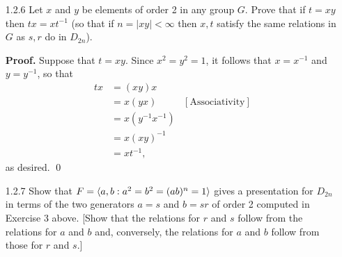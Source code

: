 \begin{enumerate}
      \textbf{Proof.} Let $n$ be an odd integer such that $n \ge 3$. Suppose to
      the contrary that there exists a nonidentity $y \in D_{2n}$ that commutes
      with every other element of $D_{2n}$.
      
      \textbf{Case 1:} \textit{$y = r^i$, with $1 \le i < n$.} By Case 1 in
      Exercise 1.2.4, it follows that $i = k$, and this contradicts
      Exercise 1.1.33(a).
      
      
      \textbf{Case 2:} \textit{$y = sr^i$, with $0 \le i < n$.} By Case 2 in
      Exercise 1.24, we will arrive at a contradiction.

      We can now conclude that the identity is the only element of $D_{2n}$ 
      which commutes with all elements of $D_{2n}$. \qed

   \item[1.2.6]   Let $x$ and $y$ be elements of order 2 in any group $G$. Prove
                  that if $t = xy$ then $tx = xt^{-1}$ (so that if
                  $n = |xy| < \infty$ then $x, t$ satisfy the same relations in
                  $G$ as $s, r$ do in $D_{2n}$).

      \textbf{Proof.} Suppose that $t = xy$. Since $x^2 = y^2 = 1$, it follows 
      that $x = x^{-1}$ and $y = y^{-1}$, so that
      \begin{align*}
         tx &= (xy)x \\
            &= x(yx) &[\text{Associativity}] \\
            &= x(y^{-1}x^{-1}) \\
            &= x(xy)^{-1} \\
            &= xt^{-1},
      \end{align*}
      as desired. \qed
   \item[1.2.7]   Show that $F = \langle a, b : a^2 = b^2 = (ab)^n = 1 \rangle$ gives a
                  presentation for $D_{2n}$ in terms of the two generators
                  $a = s$ and $b = sr$ of order 2 computed in Exercise 3 above.
                  [Show that the relations for $r$ and $s$ follow from the
                  relations for $a$ and $b$ and, conversely, the relations for
                  $a$ and $b$ follow from those for $r$ and $s$.]
                  

\end{enumerate}
